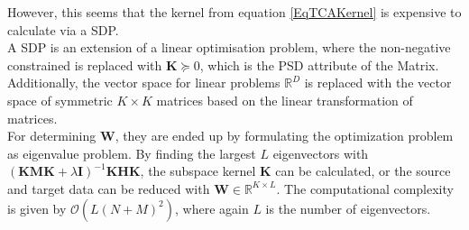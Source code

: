 However, this seems that the kernel from equation \eqref{EqTCAKernel} is expensive to calculate via a \ac{SDP}.\cite{Pan.2011}\\
A \acs{SDP} is an extension of a linear optimisation problem, where the non-negative constrained is replaced with $\mathbf{K}\succeq 0$, which is the \acs{PSD} attribute of the Matrix. Additionally, the vector space for linear problems $\mathbb{R}^D$ is replaced with the vector space of symmetric $K\times K$ matrices based on the linear transformation of matrices.\cite{Gartner.2012}\\
For determining $\mathbf{W}$, they are ended up by formulating the optimization problem as eigenvalue problem.
By finding the largest $L$ eigenvectors with $(\mathbf{KMK}+\lambda \mathbf{I})^{-1} \mathbf{KHK}$, the subspace kernel $\mathbf{K}$ can be calculated, or the source and target data can be reduced with $\mathbf{W} \in \mathbb{R}^{K\times L}$.
The computational complexity is given by $\mathcal{O}(L(N+M)^2)$, where again $L$ is the number of eigenvectors.\cite{Pan.2011}

